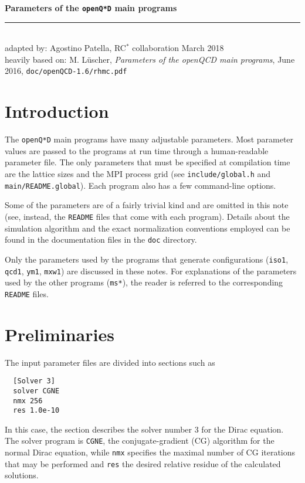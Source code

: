 \documentclass[11pt,fleqn]{article}
\begin{document}
\vspace*{20mm}

{
\sffamily
\huge
\textbf{Parameters of the \texttt{openQ*D} main programs}
\\
\rule{\textwidth}{1pt}
\\[2mm]
\large
adapted by: Agostino Patella, RC$^*$ collaboration
\hfill
March 2018
\\[10mm]
\normalsize
heavily based on: M. L\"uscher, \textit{Parameters of the openQCD main programs}, June 2016, \texttt{doc/openQCD-1.6/rhmc.pdf}
}





\pagebreak

\tableofcontents

\pagebreak



\section{Introduction}

The \texttt{openQ*D} main programs have many adjustable parameters. Most
parameter values are passed to the programs at run time through a human-readable
parameter file. The only parameters that must be specified at compilation time
are the lattice sizes and the MPI process grid (see \texttt{include/global.h}
and \texttt{main/README.global}). Each program also has a few command-line
options.

Some of the parameters are of a fairly trivial kind and are omitted in this note
(see, instead, the \texttt{README} files that come with each program). Details
about the simulation algorithm and the exact normalization conventions employed
can be found in the documentation files in the \texttt{doc} directory.

Only the parameters used by the programs that generate configurations
(\texttt{iso1}, \texttt{qcd1}, \texttt{ym1}, \texttt{mxw1}) are discussed in
these notes. For explanations of the parameters used by the other programs
(\texttt{ms*}), the reader is referred to the corresponding \texttt{README}
files.



\section{Preliminaries}

The input parameter files are divided into sections such as
%
\begin{verbatim}
  [Solver 3]
  solver CGNE
  nmx 256
  res 1.0e-10
\end{verbatim}
%
In this case, the section describes the solver number 3 for the Dirac equation.
The solver program is \texttt{CGNE}, the conjugate-gradient (CG) algorithm for
the normal Dirac equation, while \texttt{nmx} specifies the maximal number of CG
iterations that may be performed and \texttt{res} the desired relative residue
of the calculated solutions.
\end{document}
